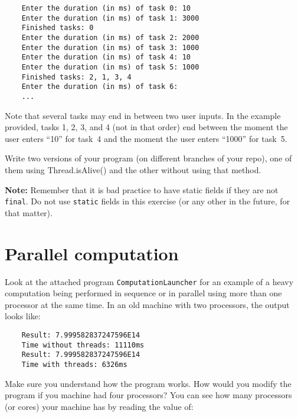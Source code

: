 \documentclass{article}
\begin{document}
\begin{verbatim}
    Enter the duration (in ms) of task 0: 10
    Enter the duration (in ms) of task 1: 3000
    Finished tasks: 0
    Enter the duration (in ms) of task 2: 2000
    Enter the duration (in ms) of task 3: 1000
    Enter the duration (in ms) of task 4: 10
    Enter the duration (in ms) of task 5: 1000
    Finished tasks: 2, 1, 3, 4
    Enter the duration (in ms) of task 6: 
    ...
\end{verbatim}

Note that several tasks may end in between two user inputs. In the
example provided, tasks 1, 2, 3, and 4 (not in that order) end
between the moment the user enters ``10'' for task~4 and the moment
the user enters ``1000'' for task~5. 

Write two versions of your program (on different branches of your
repo), one of them using Thread.isAlive() and the other without using
that method. 

\textbf{Note:} Remember that it is bad practice to have static fields if they
are not \verb+final+. Do not use \verb+static+ fields in this exercise
(or any other in the future, for that matter).


\section{Parallel computation}
\label{sec:parallel-computation}

% 

Look at the attached program \verb+ComputationLauncher+ for an example
of a heavy computation being performed in sequence or in parallel
using more than one processor at the same time. In an old machine with
two processors, the output looks like: 

\begin{verbatim}
    Result: 7.999582837247596E14
    Time without threads: 11110ms
    Result: 7.999582837247596E14
    Time with threads: 6326ms
\end{verbatim}

Make sure you understand how the program works. How would you modify
the program if you machine had four processors? You can see how many
processors (or cores) your machine has by reading the value of: 
\end{document}
